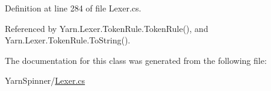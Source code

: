 Definition at line 284 of file Lexer.\-cs.



Referenced by Yarn.\-Lexer.\-Token\-Rule.\-Token\-Rule(), and Yarn.\-Lexer.\-Token\-Rule.\-To\-String().



The documentation for this class was generated from the following file\-:\begin{DoxyCompactItemize}
\item 
Yarn\-Spinner/\hyperlink{a00292}{Lexer.\-cs}\end{DoxyCompactItemize}
